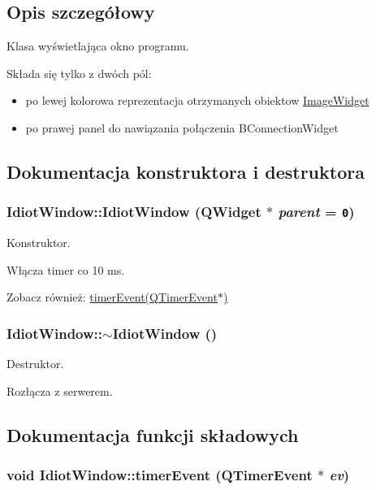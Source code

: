 \subsection{Opis szczegółowy}
Klasa wyświetlająca okno programu. 

Składa się tylko z dwóch pól: \begin{itemize}
\item po lewej kolorowa reprezentacja otrzymanych obiektow \hyperlink{class_image_widget}{ImageWidget} \item po prawej panel do nawiązania połączenia BConnectionWidget \end{itemize}


\subsection{Dokumentacja konstruktora i destruktora}
\hypertarget{class_idiot_window_028f2a727c252dcb9448a08d1379d699}{
\subsubsection[{IdiotWindow}]{\setlength{\rightskip}{0pt plus 5cm}IdiotWindow::IdiotWindow (QWidget $\ast$ {\em parent} = {\tt 0})}}
\label{class_idiot_window_028f2a727c252dcb9448a08d1379d699}


Konstruktor. 

Włącza timer co 10 ms. \begin{Desc}
\item[Zobacz również:]\hyperlink{class_idiot_window_0e90dfa970f643c1d42d1449d648cf50}{timerEvent(QTimerEvent$\ast$)} \end{Desc}
\hypertarget{class_idiot_window_2a5adb99723cac75bcf4c843653ef76b}{
\subsubsection[{$\sim$IdiotWindow}]{\setlength{\rightskip}{0pt plus 5cm}IdiotWindow::$\sim$IdiotWindow ()}}
\label{class_idiot_window_2a5adb99723cac75bcf4c843653ef76b}


Destruktor. 

Rozłącza z serwerem. 

\subsection{Dokumentacja funkcji składowych}
\hypertarget{class_idiot_window_0e90dfa970f643c1d42d1449d648cf50}{
\subsubsection[{timerEvent}]{\setlength{\rightskip}{0pt plus 5cm}void IdiotWindow::timerEvent (QTimerEvent $\ast$ {\em ev})}}
\label{class_idiot_window_0e90dfa970f643c1d42d1449d648cf50}


